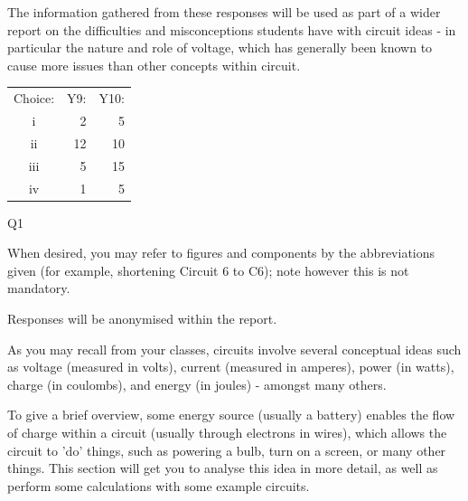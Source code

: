 \documentclass[a4paper,openany,nobib]{tufte-book}
\begin{document}
The information gathered from these responses will be used as part of a wider report on the difficulties and misconceptions students have with circuit ideas - in particular the nature and role of voltage, which has generally been known to cause more issues than other concepts within circuit.

\begin{margintable}
  \begin{center}
    \begin{tabular}{crr}
      \toprule
      Choice: & Y9: & Y10:\\
      i & 2 & 5 \\
      ii & 12 & 10\\
      iii & 5 & 15\\
      iv & 1 & 5\\
      \bottomrule
    \end{tabular}
	\caption{\centering Q1}
  \end{center}
\end{margintable}
When desired, you may refer to figures and components by the abbreviations given (for example, shortening Circuit 6 to C6); note however this is not mandatory.

Responses will be anonymised within the report.

As you may recall from your classes, circuits involve several conceptual ideas such as voltage (measured in volts), current (measured in amperes), power (in watts), charge (in coulombs), and energy (in joules) - amongst many others. 

To give a brief overview, some energy source (usually a battery) enables the flow of charge within a circuit (usually through electrons in wires), which allows the circuit to 'do' things, such as powering a bulb, turn on a screen, or many other things. This section will get you to analyse this idea in more detail, as well as perform some calculations with some example circuits.
\end{document}
